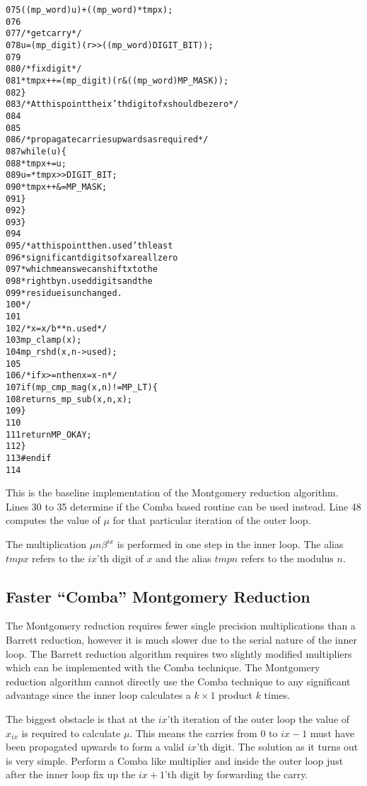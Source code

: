 \documentclass[b5paper]{book}
\begin{document}
\begin{small}
\begin{alltt}
075                     ((mp_word) u) + ((mp_word) * tmpx);
076   
077           /* get carry */
078           u       = (mp_digit)(r >> ((mp_word) DIGIT_BIT));
079   
080           /* fix digit */
081           *tmpx++ = (mp_digit)(r & ((mp_word) MP_MASK));
082         \}
083         /* At this point the ix'th digit of x should be zero */
084   
085   
086         /* propagate carries upwards as required*/
087         while (u) \{
088           *tmpx   += u;
089           u        = *tmpx >> DIGIT_BIT;
090           *tmpx++ &= MP_MASK;
091         \}
092       \}
093     \}
094   
095     /* at this point the n.used'th least
096      * significant digits of x are all zero
097      * which means we can shift x to the
098      * right by n.used digits and the
099      * residue is unchanged.
100      */
101   
102     /* x = x/b**n.used */
103     mp_clamp(x);
104     mp_rshd (x, n->used);
105   
106     /* if x >= n then x = x - n */
107     if (mp_cmp_mag (x, n) != MP_LT) \{
108       return s_mp_sub (x, n, x);
109     \}
110   
111     return MP_OKAY;
112   \}
113   #endif
114   
\end{alltt}
\end{small}

This is the baseline implementation of the Montgomery reduction algorithm.  Lines 30 to 35 determine if the Comba based
routine can be used instead.  Line 48 computes the value of $\mu$ for that particular iteration of the outer loop.  

The multiplication $\mu n \beta^{ix}$ is performed in one step in the inner loop.  The alias $tmpx$ refers to the $ix$'th digit of $x$ and
the alias $tmpn$ refers to the modulus $n$.  

\subsection{Faster ``Comba'' Montgomery Reduction}

The Montgomery reduction requires fewer single precision multiplications than a Barrett reduction, however it is much slower due to the serial
nature of the inner loop.  The Barrett reduction algorithm requires two slightly modified multipliers which can be implemented with the Comba
technique.  The Montgomery reduction algorithm cannot directly use the Comba technique to any significant advantage since the inner loop calculates
a $k \times 1$ product $k$ times. 

The biggest obstacle is that at the $ix$'th iteration of the outer loop the value of $x_{ix}$ is required to calculate $\mu$.  This means the 
carries from $0$ to $ix - 1$ must have been propagated upwards to form a valid $ix$'th digit.  The solution as it turns out is very simple.  
Perform a Comba like multiplier and inside the outer loop just after the inner loop fix up the $ix + 1$'th digit by forwarding the carry.  
\end{document}

